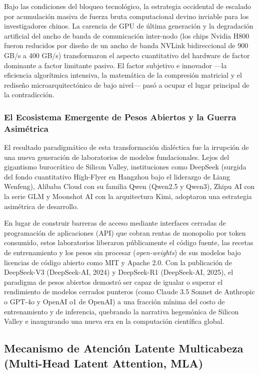 Bajo las condiciones del bloqueo tecnológico, la estrategia occidental de escalado por acumulación masiva de fuerza bruta computacional devino inviable para los investigadores chinos. La carencia de GPU de última generación y la degradación artificial del ancho de banda de comunicación inter-nodo (los chips Nvidia H800 fueron reducidos por diseño de un ancho de banda NVLink bidireccional de 900 GB/s a 400 GB/s) transformaron el aspecto cuantitativo del hardware de factor dominante a factor limitante pasivo. El factor subjetivo e innovador ---la eficiencia algorítmica intensiva, la matemática de la compresión matricial y el rediseño microarquitectónico de bajo nivel--- pasó a ocupar el lugar principal de la contradicción.

\subsubsection{El Ecosistema Emergente de Pesos Abiertos y la Guerra Asimétrica}

El resultado paradigmático de esta transformación dialéctica fue la irrupción de una nueva generación de laboratorios de modelos fundacionales. Lejos del gigantismo burocrático de Silicon Valley, instituciones como DeepSeek (surgida del fondo cuantitativo High-Flyer en Hangzhou bajo el liderazgo de Liang Wenfeng), Alibaba Cloud con su familia Qwen (Qwen2.5 y Qwen3), Zhipu AI con la serie GLM y Moonshot AI con la arquitectura Kimi, adoptaron una estrategia asimétrica de desarrollo.

En lugar de construir barreras de acceso mediante interfaces cerradas de programación de aplicaciones (API) que cobran rentas de monopolio por token consumido, estos laboratorios liberaron públicamente el código fuente, las recetas de entrenamiento y los pesos sin procesar (\textit{open-weights}) de sus modelos bajo licencias de código abierto como MIT y Apache 2.0. Con la publicación de DeepSeek-V3 (DeepSeek-AI, 2024) y DeepSeek-R1 (DeepSeek-AI, 2025), el paradigma de pesos abiertos demostró ser capaz de igualar o superar el rendimiento de modelos cerrados punteros (como Claude 3.5 Sonnet de Anthropic o GPT-4o y OpenAI o1 de OpenAI) a una fracción mínima del costo de entrenamiento y de inferencia, quebrando la narrativa hegemónica de Silicon Valley e inaugurando una nueva era en la computación científica global.

\vspace{0.4cm}

\subsection{Mecanismo de Atención Latente Multicabeza (Multi-Head Latent Attention, MLA)}

